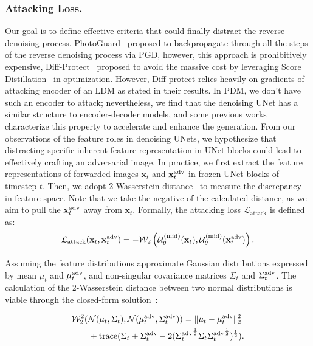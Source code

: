 \subsubsection{Attacking Loss.}
Our goal is to define effective criteria that could finally distract the reverse denoising process. PhotoGuard~\cite{salman2023raisingcostmaliciousaipowered} proposed to backpropagate through all the steps of the reverse denoising process via PGD, however, this approach is prohibitively expensive, Diff-Protect~\cite{xue2024effectiveprotectiondiffusionbased} proposed to avoid the massive cost by leveraging Score Distillation~\cite{poole2022dreamfusiontextto3dusing2d} in optimization. However, Diff-protect relies heavily on gradients of attacking encoder of an LDM as stated in their results. In PDM, we don't have such an encoder to attack; nevertheless, we find that the denoising UNet has a similar structure to encoder-decoder models, and some previous works~\cite{lin2024diffusionmodelperceptualloss, li2023fasterdiffusionrethinkingrole} characterize this property to accelerate and enhance the generation. From our observations of the feature roles in denoising UNets, we hypothesize that distracting specific inherent feature representation in UNet blocks could lead to effectively crafting an adversarial image. In practice, we first extract the feature representations of forwarded images $\mathbf{x}_t$ and $\mathbf{x}^{\adv}_t$ in frozen UNet blocks of timestep $t$. Then, we adopt 2-Wasserstein distance~\cite{arjovsky2017wasserstein} to measure the discrepancy in feature space. Note that we take the negative of the calculated distance, as we aim to pull the $\mathbf{x}^{\adv}_t$ away from $\mathbf{x}_t$. Formally, the attacking loss $\mathcal{L}_\text{attack}$ is defined as:
\begin{equation}
    \mathcal{L}_\text{attack}(\mathbf{x}_t, \mathbf{x}^{\adv}_t)
    =-\mathcal{W}_2 \left(
    \mathcal{U}^\text{(mid)}_{\theta}(\mathbf{x}_t), \mathcal{U}^\text{(mid)}_{\theta}(\mathbf{x}^{\adv}_t)
    \right).
\end{equation}

\noindent Assuming the feature distributions approximate Gaussian distributions expressed by mean $\mu_t$ and $\mu_t^{\adv}$, and non-singular covariance matrices $\Sigma_t$ and $\Sigma_t^{\adv}$. The calculation of the 2-Wasserstein distance between two normal distributions is viable through the closed-form solution~\cite{dowson1982frechet, olkin1982distance, chen2018optimal}:

\begin{equation}
    \begin{aligned}
        & \mathcal{W}_2^2(\mathcal{N}(\mu_t, \Sigma_t), \mathcal{N}(\mu_t^{\adv}, \Sigma_t^{\adv}))
        = \|\mu_t-\mu_t^{\adv}\|_2^2 \\
        & \qquad + \text{trace} (\Sigma_t + \Sigma_t^{\adv}
        -2({\Sigma_t^{\adv}}^{\frac{1}{2}}\Sigma_t{\Sigma_t^{\adv}}^{\frac{1}{2}})^\frac{1}{2} ).
    \end{aligned}
    \label{eq:wasserstein_distance}
\end{equation}

